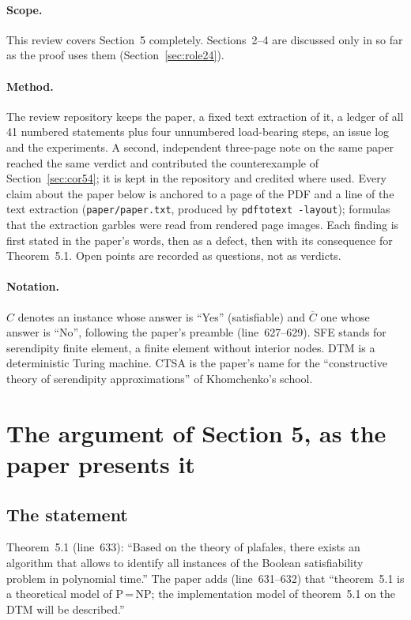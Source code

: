 \documentclass[11pt,a4paper]{article}
\newcommand{\Cbar}{\overline{C}}
\newcommand{\paperline}[1]{(line~#1)}
\begin{document}
\paragraph{Scope.} This review covers Section~5 completely. Sections~2--4 are discussed only in so far as the proof uses them (Section~\ref{sec:role24}).

\paragraph{Method.} The review repository keeps the paper, a fixed text extraction of it, a ledger of all 41 numbered statements plus four unnumbered load-bearing steps, an issue log and the experiments. A second, independent three-page note on the same paper \cite{note} reached the same verdict and contributed the counterexample of Section~\ref{sec:cor54}; it is kept in the repository and credited where used. Every claim about the paper below is anchored to a page of the PDF and a line of the text extraction (\texttt{paper/paper.txt}, produced by \texttt{pdftotext -layout}); formulas that the extraction garbles were read from rendered page images. Each finding is first stated in the paper's words, then as a defect, then with its consequence for Theorem~5.1. Open points are recorded as questions, not as verdicts.

\paragraph{Notation.} $C$ denotes an instance whose answer is ``Yes'' (satisfiable) and $\Cbar$ one whose answer is ``No'', following the paper's preamble \paperline{627--629}. SFE stands for serendipity finite element, a finite element without interior nodes. DTM is a deterministic Turing machine. CTSA is the paper's name for the ``constructive theory of serendipity approximations'' of Khomchenko's school.

\section{The argument of Section 5, as the paper presents it}
\label{sec:argument}

\subsection{The statement}

Theorem~5.1 \paperline{633}: ``Based on the theory of plafales, there exists an algorithm that allows to identify all instances of the Boolean satisfiability problem in polynomial time.'' The paper adds \paperline{631--632} that ``theorem~5.1 is a theoretical model of P\,=\,NP; the implementation model of theorem~5.1 on the DTM will be described.''
\end{document}
